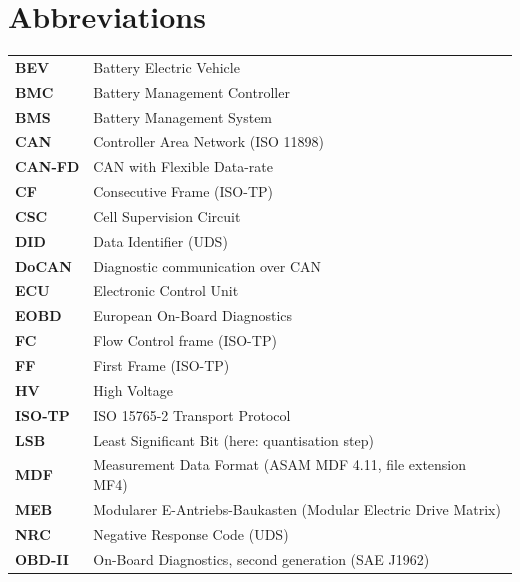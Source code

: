 \documentclass[11pt,a4paper,oneside,parskip=half]{scrreprt}
\begin{document}
\tableofcontents
{}

\listoffigures
{}

\chapter*{Abbreviations}

\begin{tabular}{@{}lp{10.5cm}@{}}
\textbf{BEV}   & Battery Electric Vehicle \\
\textbf{BMC}   & Battery Management Controller \\
\textbf{BMS}   & Battery Management System \\
\textbf{CAN}   & Controller Area Network (ISO 11898) \\
\textbf{CAN-FD}& CAN with Flexible Data-rate \\
\textbf{CF}    & Consecutive Frame (ISO-TP) \\
\textbf{CSC}   & Cell Supervision Circuit \\
\textbf{DID}   & Data Identifier (UDS) \\
\textbf{DoCAN} & Diagnostic communication over CAN \\
\textbf{ECU}   & Electronic Control Unit \\
\textbf{EOBD}  & European On-Board Diagnostics \\
\textbf{FC}    & Flow Control frame (ISO-TP) \\
\textbf{FF}    & First Frame (ISO-TP) \\
\textbf{HV}    & High Voltage \\
\textbf{ISO-TP}& ISO 15765-2 Transport Protocol \\
\textbf{LSB}   & Least Significant Bit (here: quantisation step) \\
\textbf{MDF}   & Measurement Data Format (ASAM MDF 4.11, file extension MF4) \\
\textbf{MEB}   & Modularer E-Antriebs-Baukasten (Modular Electric Drive Matrix) \\
\textbf{NRC}   & Negative Response Code (UDS) \\
\textbf{OBD-II}& On-Board Diagnostics, second generation (SAE J1962) \\

\end{tabular}
\end{document}
